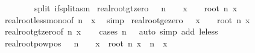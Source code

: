 \begin{isabellebody}
\ \ \ \ \ \ \ \ split{\isacharcolon}{\kern0pt}\ if{\isacharunderscore}{\kern0pt}split{\isacharunderscore}{\kern0pt}asm{\isacharparenright}{\kern0pt}\isanewline
{}\isamarkupfalse%
%
\endisatagproof
{\isafoldproof}%
%
\isadelimproof
\isanewline
%
\endisadelimproof
\isanewline
{}\isamarkupfalse%
\ real{\isacharunderscore}{\kern0pt}root{\isacharunderscore}{\kern0pt}gt{\isacharunderscore}{\kern0pt}zero{\isacharcolon}{\kern0pt}\ {\isachardoublequoteopen}{}\ {\isacharless}{\kern0pt}\ n\ {\isasymLongrightarrow}\ {}\ {\isacharless}{\kern0pt}\ x\ {\isasymLongrightarrow}\ {}\ {\isacharless}{\kern0pt}\ root\ n\ x{\isachardoublequoteclose}\isanewline
%
\isadelimproof
\ \ %
\endisadelimproof
%
\isatagproof
{}\isamarkupfalse%
\ real{\isacharunderscore}{\kern0pt}root{\isacharunderscore}{\kern0pt}less{\isacharunderscore}{\kern0pt}mono{\isacharbrackleft}{\kern0pt}of\ n\ {}\ x{\isacharbrackright}{\kern0pt}\ \isamarkupfalse%
\ simp%
\endisatagproof
{\isafoldproof}%
%
\isadelimproof
\isanewline
%
\endisadelimproof
\isanewline
{}\isamarkupfalse%
\ real{\isacharunderscore}{\kern0pt}root{\isacharunderscore}{\kern0pt}ge{\isacharunderscore}{\kern0pt}zero{\isacharcolon}{\kern0pt}\ {\isachardoublequoteopen}{}\ {\isasymle}\ x\ {\isasymLongrightarrow}\ {}\ {\isasymle}\ root\ n\ x{\isachardoublequoteclose}\isanewline
%
\isadelimproof
\ \ %
\endisadelimproof
%
\isatagproof
{}\isamarkupfalse%
\ real{\isacharunderscore}{\kern0pt}root{\isacharunderscore}{\kern0pt}gt{\isacharunderscore}{\kern0pt}zero{\isacharbrackleft}{\kern0pt}of\ n\ x{\isacharbrackright}{\kern0pt}\isanewline
\ \ \isamarkupfalse%
\ {\isacharparenleft}{\kern0pt}cases\ {\isachardoublequoteopen}n\ {\isacharequal}{\kern0pt}\ {}{\isachardoublequoteclose}{\isacharparenright}{\kern0pt}\ {\isacharparenleft}{\kern0pt}auto\ simp\ add{\isacharcolon}{\kern0pt}\ le{\isacharunderscore}{\kern0pt}less{\isacharparenright}{\kern0pt}%
\endisatagproof
{\isafoldproof}%
%
\isadelimproof
\isanewline
%
\endisadelimproof
\isanewline
{}\isamarkupfalse%
\ real{\isacharunderscore}{\kern0pt}root{\isacharunderscore}{\kern0pt}pow{\isacharunderscore}{\kern0pt}pos{\isacharcolon}{\kern0pt}\ {\isachardoublequoteopen}{}\ {\isacharless}{\kern0pt}\ n\ {\isasymLongrightarrow}\ {}\ {\isacharless}{\kern0pt}\ x\ {\isasymLongrightarrow}\ root\ n\ x\ {\isacharcircum}{\kern0pt}\ n\ {\isacharequal}{\kern0pt}\ x{\isachardoublequoteclose}\ \ \isanewline

\end{isabellebody}
